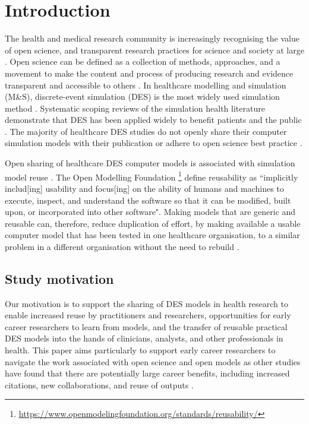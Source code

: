 \documentclass[]{interact}
\theoremstyle{plain}%
\theoremstyle{definition}
\theoremstyle{remark}
\begin{document}
\section{Introduction}

The health and medical research community is increasingly recognising the value of open science, and transparent research practices for science and society at large \citep{Zecevic2021, goldacre2019researchers, celi2019plos}. Open science can be defined as a collection of methods, approaches, and a movement to make the content and process of producing research and evidence transparent and accessible to others \citep{Munafo2017}. In healthcare modelling and simulation (M\&S), discrete-event simulation (DES) is the most widely used simulation method \citep{salleh2017simulation, philip_2022, roy_2021, SALMON20181}. Systematic scoping reviews of the simulation health literature demonstrate that DES has been applied widely to benefit patients and the public \citep{VazquezSerrano2021, Forbus2022, roy_2021}. The majority of healthcare DES studies do not openly share their computer simulation models with their publication or adhere to open science best practice \citep{monks2023computer}. 



Open sharing of healthcare DES computer models is associated with simulation model reuse \citep{robinson2005discrete}. The Open Modelling Foundation \citep{omf}\footnote{\url{https://www.openmodelingfoundation.org/standards/reusability/}} define reusability as ``implicitly includ[ing] usability and focus[ing] on the ability of humans and machines to execute, inspect, and understand the software so that it can be modified, built upon, or incorporated into other software". Making models that are generic and reusable can, therefore, reduce duplication of effort, by making available a usable computer model that has been tested in one healthcare organisation, to a similar problem in a different organisation without the need to rebuild \citep{Fletcher2009, crowe2023here}.



\subsection{Study motivation}

Our motivation is to support the sharing of DES models in health research to enable increased reuse by practitioners and researchers, opportunities for early career researchers to learn from models, and the transfer of reusable practical DES models into the hands of clinicians, analysts, and other professionals in health. This paper aims particularly to support early career researchers to navigate the work associated with open science and open models as other studies have found that there are potentially large career benefits, including increased citations, new collaborations, and reuse of outputs \citep{Allen2019, mckiernan2016open}. 
\end{document}
